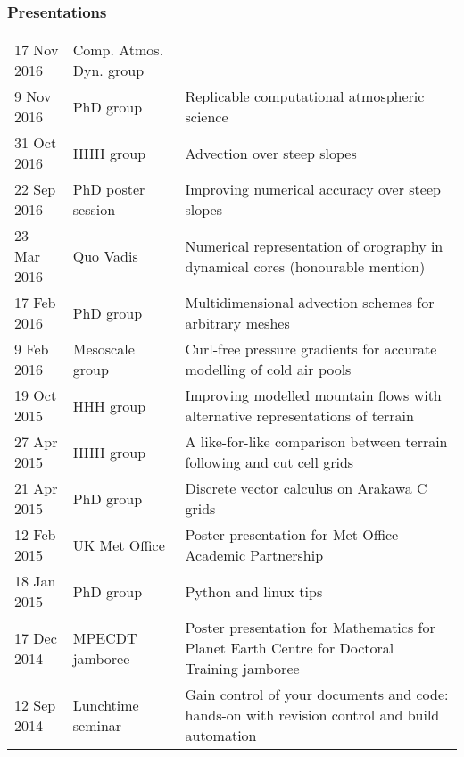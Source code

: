 \documentclass[a4paper,11pt]{article}
\begin{document}
\subsubsection*{Presentations}
\begin{tabularx}{\linewidth}{l l X}
17 Nov 2016 & Comp. Atmos. Dyn. group & \\
9 Nov 2016 & PhD group & Replicable computational atmospheric science \\
31 Oct 2016 & HHH group & Advection over steep slopes \\
22 Sep 2016 & PhD poster session & Improving numerical accuracy over steep slopes \\
23 Mar 2016 & Quo Vadis & Numerical representation of orography in dynamical cores (honourable mention) \\
17 Feb 2016 & PhD group & Multidimensional advection schemes for arbitrary meshes \\
9 Feb 2016 & Mesoscale group & Curl-free pressure gradients for accurate modelling of cold air pools \\
19 Oct 2015 & HHH group & Improving modelled mountain flows with alternative representations of terrain \\
27 Apr 2015 & HHH group & A like-for-like comparison between terrain following and cut cell grids \\
21 Apr 2015 & PhD group & Discrete vector calculus on Arakawa C grids \\
12 Feb 2015 & UK Met Office & Poster presentation for Met Office Academic Partnership \\
18 Jan 2015 & PhD group & Python and linux tips \\
17 Dec 2014 & MPECDT jamboree & Poster presentation for Mathematics for Planet Earth Centre for Doctoral Training jamboree \\
12 Sep 2014 & Lunchtime seminar  & Gain control of your documents and code: hands-on with revision control and build automation \\
\end{tabularx}
\end{document}
